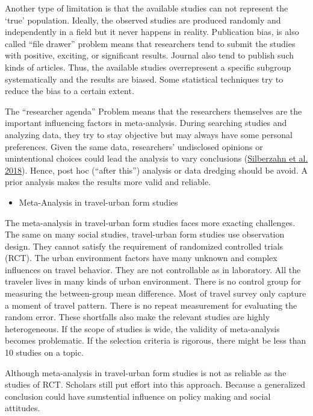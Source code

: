 \documentclass[
  11pt,
  openany]{memoir}
\providecommand{\tightlist}{%
  \setlength{\itemsep}{0pt}\setlength{\parskip}{0pt}}
\begin{document}
Another type of limitation is that the available studies can not represent the `true' population.
Ideally, the observed studies are produced randomly and independently in a field but it never happens in reality.
Publication bias, is also called ``file drawer'' problem means that researchers tend to submit the studies with positive, exciting, or significant results. Journal also tend to publish such kinds of articles.
Thus, the available studies overrepresent a specific subgroup systematically and the results are biased.
Some statistical techniques try to reduce the bias to a certain extent.

The ``researcher agenda'' Problem means that the researchers themselves are the important influencing factors in meta-analysis. During searching studies and analyzing data, they try to stay objective but may always have some personal preferences.
Given the same data, researchers' undisclosed opinions or unintentional choices could lead the analysis to vary conclusions (\protect\hyperlink{ref-silberzahnManyAnalystsOne2018}{Silberzahn et al. 2018}).
Hence, post hoc (``after this'') analysis or data dredging should be avoid. A prior analysis makes the results more valid and reliable.

\begin{itemize}
\tightlist
\item
  Meta-Analysis in travel-urban form studies
\end{itemize}

The meta-analysis in travel-urban form studies faces more exacting challenges.
The same on many social studies, travel-urban form studies use observation design. They cannot satisfy the requirement of randomized controlled trials (RCT).
The urban environment factors have many unknown and complex influences on travel behavior. They are not controllable as in laboratory.
All the traveler lives in many kinds of urban environment. There is no control group for measuring the between-group mean difference.
Most of travel survey only capture a moment of travel pattern. There is no repeat measurement for evaluating the random error.
These shortfalls also make the relevant studies are highly heterogeneous. If the scope of studies is wide, the validity of meta-analysis becomes problematic. If the selection criteria is rigorous, there might be less than 10 studies on a topic.

Although meta-analysis in travel-urban form studies is not as reliable as the studies of RCT. Scholars still put effort into this approach. Because a generalized conclusion could have sumstential influence on policy making and social attitudes.
\end{document}
